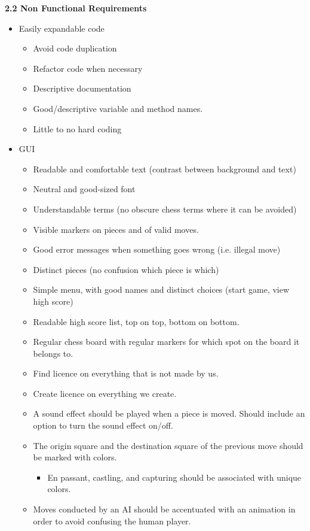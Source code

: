 \documentclass{article}
\begin{document}
\begin{flushleft}

\textbf{2.2	Non Functional Requirements}
\begin{itemize}
	\item Easily expandable code
	\begin{itemize}
		\item Avoid code duplication
		\item Refactor code when necessary 
		\item Descriptive documentation
		\item Good/descriptive variable and method names.
		\item Little to no hard coding
	\end{itemize}
	\item GUI
	\begin{itemize}
		\item Readable and comfortable text (contrast between background and text)
		\item Neutral and good-sized font
		\item Understandable terms (no obscure chess terms where it can be avoided)
		\item Visible markers on pieces and of valid moves.
		\item Good error messages when something goes wrong (i.e. illegal move)
		\item Distinct pieces (no confusion which piece is which)
		\item Simple menu, with good names and distinct choices (start game, view high score)
		\item Readable high score list, top on top, bottom on bottom.
		\item Regular chess board with regular markers for which spot on the board it belongs to.
		\item Find licence on everything that is not made by us.
		\item Create licence on everything we create.
		\item A sound effect should be played when a piece is moved. Should include an option to turn the sound effect on/off.
		\item The origin square and the destination square of the previous move should be marked with colors.
		\begin{itemize}
			\item En passant, castling, and capturing should be associated with unique colors.
		\end{itemize}
		\item Moves conducted by an AI should be accentuated with an animation in order to avoid confusing the human player.

\end{itemize}
\end{itemize}
\end{flushleft}
\end{document}
